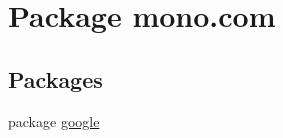 \hypertarget{namespacemono_1_1com}{\section{Package mono.\+com}
\label{namespacemono_1_1com}
}
\subsection*{Packages}
\begin{DoxyCompactItemize}
\item 
package \hyperlink{namespacemono_1_1com_1_1google}{google}
\end{DoxyCompactItemize}
